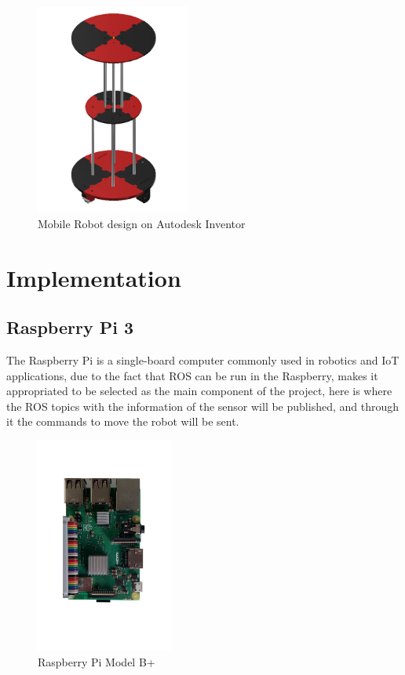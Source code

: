 \begin{figure}[h!]
    \centering
 	\includegraphics[trim=0 0 0 0,clip,width=0.45\textwidth]{Figs/Robot.png}
    \caption{Mobile Robot design on Autodesk Inventor}
    \label{fig:Robot}
\end{figure}

\newpage
\section{Implementation}

\subsection{Raspberry Pi 3}
The Raspberry Pi is a single-board computer commonly used in robotics and IoT applications, due to the fact that ROS can be run in the Raspberry, makes it appropriated to be selected as the main component of the project, here is where the ROS topics with the information of the sensor will be published, and through it the commands to move the robot will be sent.

\begin{figure}[h!]
    \centering
 	\includegraphics[trim=0 0 0 0,clip,width=0.4\textwidth]{Figs/Raspberry1.png}
    \caption{Raspberry Pi Model B+}
    \label{fig:RPI}
\end{figure}

